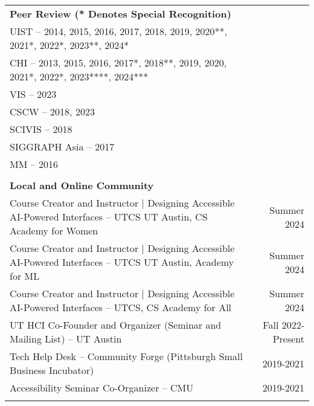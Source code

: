 \begin{longtable}{Xr}
	\textbf{Peer Review (* Denotes Special Recognition)} &  \\
	UIST -- 2014, 2015, 2016, 2017, 2018, 2019, 2020**, 2021*, 2022*, 2023**, 2024* &  \\
	CHI -- 2013, 2015, 2016, 2017*, 2018**, 2019, 2020, 2021*, 2022*, 2023****, 2024*** &  \\
	VIS -- 2023 &  \\
	CSCW -- 2018, 2023 &  \\
	SCIVIS -- 2018 &  \\
	SIGGRAPH Asia -- 2017 &  \\
	MM -- 2016 &  \\
	\\

	\textbf{Local and Online Community} &  \\
	Course Creator and Instructor | Designing Accessible AI-Powered Interfaces -- UTCS UT Austin, CS Academy for Women & Summer 2024 \\
	Course Creator and Instructor | Designing Accessible AI-Powered Interfaces -- UTCS UT Austin, Academy for ML & Summer 2024 \\
	Course Creator and Instructor | Designing Accessible AI-Powered Interfaces -- UTCS, CS Academy for All & Summer 2024 \\
	UT HCI Co-Founder and Organizer (Seminar and Mailing List) -- UT Austin & Fall 2022-Present \\
	Tech Help Desk -- Community Forge (Pittsburgh Small Business Incubator) & 2019-2021 \\
	Accessibility Seminar Co-Organizer -- CMU & 2019-2021 \\
	\\

\end{longtable}